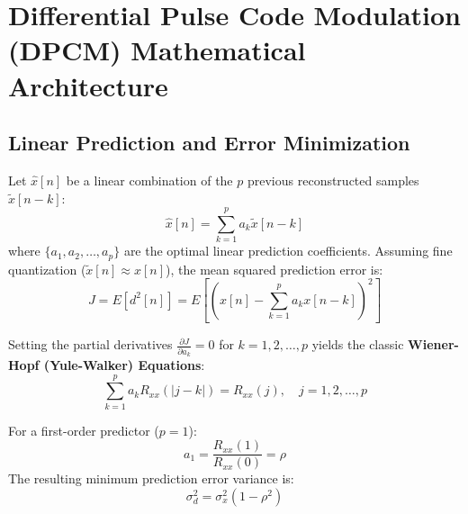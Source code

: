 \documentclass[11pt,a4paper]{article}
\begin{document}
\begin{center}
\end{center}

\section{Differential Pulse Code Modulation (DPCM) Mathematical Architecture}

\subsection{Linear Prediction and Error Minimization}
Let $\hat{x}[n]$ be a linear combination of the $p$ previous reconstructed samples $\tilde{x}[n-k]$:
\begin{equation}
\hat{x}[n] = \sum_{k=1}^p a_k \tilde{x}[n-k]
\end{equation}
where $\{a_1, a_2, \dots, a_p\}$ are the optimal linear prediction coefficients. Assuming fine quantization ($\tilde{x}[n] \approx x[n]$), the mean squared prediction error is:
\begin{equation}
J = E[d^2[n]] = E\left[\left(x[n] - \sum_{k=1}^p a_k x[n-k]\right)^2\right]
\end{equation}

Setting the partial derivatives $\frac{\partial J}{\partial a_k} = 0$ for $k = 1, 2, \dots, p$ yields the classic \textbf{Wiener-Hopf (Yule-Walker) Equations}:
\begin{equation}
\sum_{k=1}^p a_k R_{xx}(|j - k|) = R_{xx}(j), \quad j = 1, 2, \dots, p
\end{equation}

For a first-order predictor ($p = 1$):
\begin{equation}
a_1 = \frac{R_{xx}(1)}{R_{xx}(0)} = \rho
\end{equation}
The resulting minimum prediction error variance is:
\begin{equation}
\sigma_d^2 = \sigma_x^2 (1 - \rho^2)
\end{equation}
\end{document}
